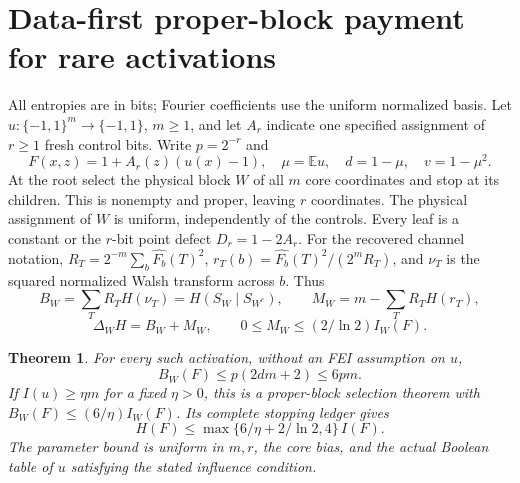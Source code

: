 \documentclass{article}
\newtheorem{theorem}{Theorem}
\begin{document}
\section*{Data-first proper-block payment for rare activations}
All entropies are in bits; Fourier coefficients use the uniform normalized basis.
Let $u:\{-1,1\}^m\to\{-1,1\}$, $m\ge1$, and let $A_r$ indicate one specified assignment of $r\ge1$ fresh control bits. Write $p=2^{-r}$ and
\[F(x,z)=1+A_r(z)(u(x)-1),\quad \mu=\mathbb Eu,\quad d=1-\mu,\quad v=1-\mu^2.\]
At the root select the physical block $W$ of all $m$ core coordinates and stop at its children. This is nonempty and proper, leaving $r$ coordinates. The physical assignment of $W$ is uniform, independently of the controls. Every leaf is a constant or the $r$-bit point defect $D_r=1-2A_r$.
For the recovered channel notation, $R_T=2^{-m}\sum_b\widehat{F_b}(T)^2$, $r_T(b)=\widehat{F_b}(T)^2/(2^mR_T)$, and $\nu_T$ is the squared normalized Walsh transform across $b$. Thus
\[B_W=\sum_T R_T H(\nu_T)=H(S_W\mid S_{W^c}),\qquad M_W=m-\sum_T R_TH(r_T),\]
\[\Delta_WH=B_W+M_W,\qquad 0\le M_W\le (2/\ln2)I_W(F).\]
\begin{theorem}
For every such activation, without an FEI assumption on $u$,
\[B_W(F)\le p(2dm+2)\le6pm.\]
If $I(u)\ge\eta m$ for a fixed $\eta>0$, this is a proper-block selection theorem with $B_W(F)\le(6/\eta)I_W(F)$. Its complete stopping ledger gives
\[H(F)\le \max\{6/\eta+2/\ln2,4\}\,I(F).\]
The parameter bound is uniform in $m,r$, the core bias, and the actual Boolean table of $u$ satisfying the stated influence condition.
\end{theorem}
\end{document}
